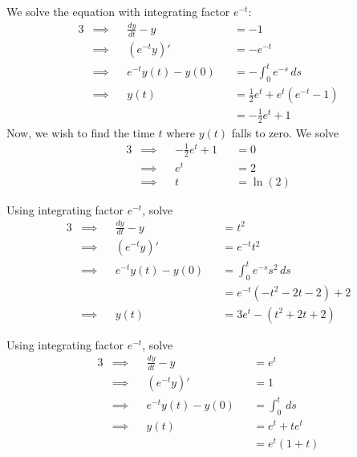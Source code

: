 \documentclass[a4paper]{article}
\begin{document}
\vspace{12pt}


We solve the equation with integrating factor \(e^{-t}\):
\begin{alignat*}{3}
	&\implies && \frac{d y}{d t} - y && = -1 \\
	&\implies && \!\left( e^{-t}y \right)' && = -e^{-t} \\
	&\implies && e^{-t} y \!\left( t \right) - y \!\left( 0 \right) && = -\int^{t}_{0} e^{-s} \, ds \\
	&\implies && y \!\left( t \right) && = \frac{1}{2}e^{t} + e^{t} \!\left( e^{-t} - 1 \right) \\
	& && && = -\frac{1}{2}e^{t} + 1
\end{alignat*}
Now, we wish to find the time \(t\) where \(y \!\left( t \right) \) falls to zero. We solve
\begin{alignat*}{3}
	&\implies && -\frac{1}{2}e^{t} + 1 && = 0 \\
	&\implies && e^{t} && = 2 \\ 
	&\implies && t && = \ln\left( 2 \right)
\end{alignat*}


Using integrating factor \(e^{-t}\), solve
\begin{alignat*}{3}
	&\implies && \frac{d y}{d t} - y && = t^{2} \\
	&\implies && \!\left( e^{-t}y \right)' && = e^{-t}t^{2} \\ 
	&\implies && e^{-t}y \!\left( t \right) - y \!\left( 0 \right) && = \int^{t}_{0} e^{-s}s^{2} \, ds \\
	& && && = e^{-t} \!\left( -t^{2} - 2t - 2 \right) + 2 \\
	&\implies && y \!\left( t \right) && = 3e^{t} - \!\left( t^{2} + 2t + 2 \right)  
\end{alignat*}


Using integrating factor \(e^{-t}\), solve
\begin{alignat*}{3}
	&\implies && \frac{d y}{d t} - y && = e^{t} \\
	&\implies && \!\left( e^{-t}y \right)' && = 1 \\ 
	&\implies && e^{-t} y \!\left( t \right) - y \!\left( 0 \right) && = \int^{t}_{0}  \, ds \\
	&\implies && y \!\left( t \right) && = e^{t} + t e^{t} \\
	& && && = e^{t} \!\left( 1 + t \right) 
\end{alignat*}
\end{document}
